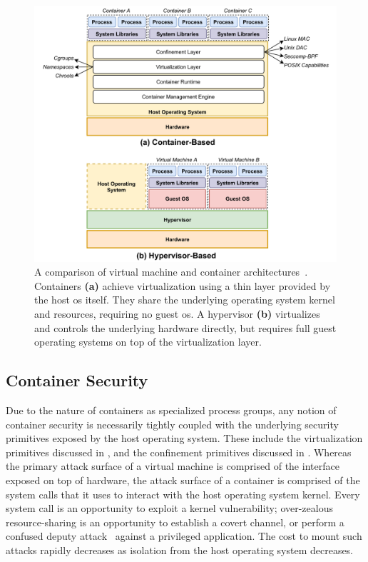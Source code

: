 \documentclass[
  fontsize=12pt,
  titlepage=firstiscover,
  paper=letter,
oneside,
  cleardoublepage=plain,
  parskip=half-,
  DIV=10,
  parindent,
  appendixprefix,
  chapterprefix,
  listof=totoc,
]{scrbook}
\begin{document}
\begin{figure}[htbp]
  \centering
  \includegraphics[width=1\linewidth]{figs/background/virtualization.pdf}
  \caption[A comparison of virtual machine and container architectures]{
    A comparison of virtual machine and container
    architectures~\cite{sultan2019_container_security, eder2016_hypervisor_container}.
    Containers \textbf{(a)} achieve virtualization using a thin layer provided by the host
    \gls{os} itself. They share the underlying operating system kernel and resources,
    requiring no guest \gls{os}. A hypervisor \textbf{(b)} virtualizes and controls the
    underlying hardware directly, but requires full guest operating systems on top of the
    virtualization layer.
  }\label{fig:virt}
\end{figure}



\subsection{Container Security}\label{ss:container-security-bg}

Due to the nature of containers as specialized process groups, any notion of container
security is necessarily tightly coupled with the underlying security primitives exposed by
the host operating system. These include the virtualization primitives discussed in
, and the confinement primitives discussed in
. Whereas the primary attack surface
of a virtual machine is comprised of the interface exposed on top of hardware, the attack
surface of a container is comprised of the system calls that it uses to interact with the
host operating system kernel. Every system call is an opportunity to exploit a kernel
vulnerability; over-zealous resource-sharing is an opportunity to establish a covert
channel, or perform a confused deputy attack~\cite{hardy1988_confused_deputy} against
a privileged application. The cost to mount such attacks rapidly decreases as isolation
from the host operating system decreases.
\end{document}
